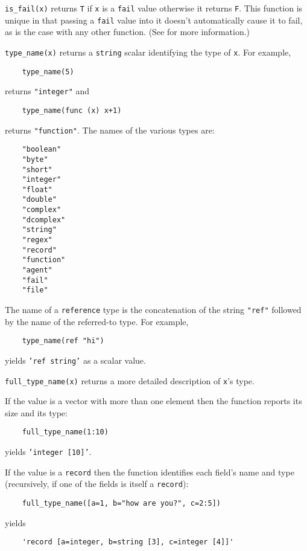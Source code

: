 \begin{list}{}{}
\item[{\tt is\_fail(x)}] \label{is_fail-func} 
returns {\tt T} if {\tt x} is a {\tt fail} value otherwise it returns {\tt F}.
This function is unique in that passing a {\tt fail} value into it doesn't
automatically cause it to fail, as is the case with any other function.
(See  for more information.)

\item[{\tt type\_name(x)}] \label{type_name-func} 
returns a {\tt string} scalar identifying the
type of {\tt x}.  For example,
\begin{verbatim}
    type_name(5)
\end{verbatim}
returns {\tt "integer"} and
\begin{verbatim}
    type_name(func (x) x+1)
\end{verbatim}
returns {\tt "function"}.  The names of the various types are:
\begin{verbatim}
    "boolean"
    "byte"
    "short"
    "integer"
    "float"
    "double"
    "complex"
    "dcomplex"
    "string"
    "regex"
    "record"
    "function"
    "agent"
    "fail"
    "file"
\end{verbatim}

The name of a {\tt reference} type is the concatenation of the string
{\tt "ref"} followed by the name of the referred-to
type.  For example,
\begin{verbatim}
    type_name(ref "hi")
\end{verbatim}
yields {\tt 'ref string'} as a scalar value.

\item[{\tt full\_type\_name(x)}] \label{full_type_name-func}
returns a more detailed description of {\tt x}'s type.

If the value is a vector with more than one element then the function
reports its size and its type:
\begin{verbatim}
    full_type_name(1:10)
\end{verbatim}
yields {\tt 'integer [10]'}.

If the value is a {\tt record} then the function identifies each field's
name and type (recursively, if one of the fields is itself a {\tt record}):
\begin{verbatim}
    full_type_name([a=1, b="how are you?", c=2:5])
\end{verbatim}
yields
\begin{verbatim}
    'record [a=integer, b=string [3], c=integer [4]]'
\end{verbatim}


\end{list}
